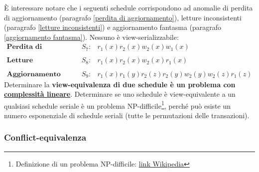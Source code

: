 \documentclass[a4paper]{article}
\begin{document}
	È interessare notare che i seguenti schedule corrispondono ad anomalie di perdita di aggiornamento (paragrafo \ref{perdita di aggiornamento}), letture inconsistenti (paragrafo \ref{letture inconsistenti}) e aggiornamento fantasma (paragrafo \ref{aggiornamento fantasma}). Nessuno è view-serializzabile:
	\begin{equation*}
		\begin{array}{lll}
			\textbf{Perdita di aggiornamento} & S_{7} : & r_{1}\left(x\right) r_{2}\left(x\right) w_{2}\left(x\right) w_{1}\left(x\right) \\
			\\
			\textbf{Letture inconsistenti} & S_{8} : & r_{1}\left(x\right) r_{2}\left(x\right) w_{2}\left(x\right) r_{1}\left(x\right) \\
			\\
			\textbf{Aggiornamento fantasma} & S_{9} : & r_{1}\left(x\right) r_{1}\left(y\right) r_{2}\left(z\right) r_{2}\left(y\right) w_{2}\left(y\right) w_{2}\left(z\right) r_{1}\left(z\right)
		\end{array}
	\end{equation*}
	Determinare la \textbf{view-equivalenza di due schedule è un problema con \underline{complessità lineare}}. Determinare se uno schedule è view-equivalente a un qualsiasi schedule seriale è un problema NP-difficile\footnote{Definizione di un problema NP-difficile: \href{https://it.wikipedia.org/wiki/NP-difficile}{link Wikipedia}}, perché può esiste un numero esponenziale di schedule seriali (tutte le permutazioni delle transazioni).\newpage
	
	\subsubsection{Conflict-equivalenza}
	
\end{document}
